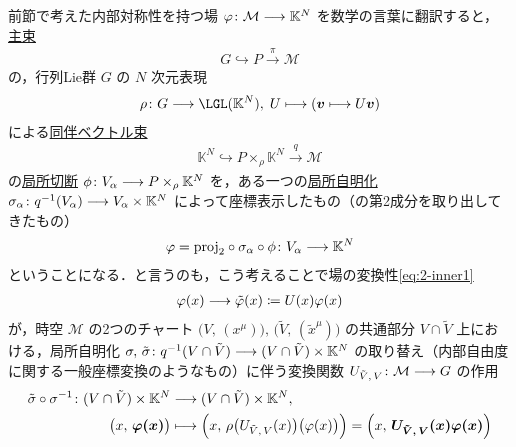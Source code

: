 \documentclass[geometry_main]{subfiles}
\begin{document}

    
前節で考えた内部対称性を持つ場 $\varphi \colon \mathcal{M} \longrightarrow \mathbb{K}^N$ を数学の言葉に翻訳すると，\hyperref[def.PFD]{主束}
\begin{align}
    G \hookrightarrow P \xrightarrow{\pi} \mathcal{M}
\end{align}
の，行列Lie群 $G$ の $N$ 次元表現
\begin{align}
    \rho \colon G \lto \LGL (\mathbb{K}^N),\; U \lmto (\bm{v} \lmto U\bm{v})
\end{align}
による\hyperref[def:associated-vect]{同伴ベクトル束}
\begin{align}
    \mathbb{K}^N \hookrightarrow P \times_\rho \mathbb{K}^N \xrightarrow{q} \mathcal{M}
\end{align}
の\hyperref[def.section]{局所切断} $\phi \colon V_\alpha \longrightarrow P \times_\rho \mathbb{K}^N$ を，ある一つの\hyperref[def.fiber-1]{局所自明化} $\sigma_\alpha \colon q^{-1}(V_\alpha) \longrightarrow V_\alpha \times \mathbb{K}^N$ によって座標表示したもの（の第2成分を取り出してきたもの）
\begin{align}
    \varphi = \mathrm{proj}_2 \circ \sigma_\alpha \circ \phi \colon V_\alpha \longrightarrow \mathbb{K}^N
\end{align}
ということになる．と言うのも，こう考えることで場の変換性\eqref{eq:2-inner1}
\begin{align}
    \varphi(x) \longrightarrow \tilde{\varphi}(x) \coloneqq U(x) \varphi (x)
\end{align}
が，時空 $\mathcal{M}$ の2つのチャート $\bigl(V,\, (x^\mu)\bigr),\, \bigl(\tilde{V},\, (\tilde{x}^\mu)\bigr)$ の共通部分 $V \cap \tilde{V}$ 上における，局所自明化 $\sigma,\, \tilde{\sigma} \colon q^{-1} (V \cap \tilde{V}) \longrightarrow (V \cap \tilde{V}) \times \mathbb{K}^N$ の取り替え（内部自由度に関する一般座標変換のようなもの）に伴う変換関数 $U_{\tilde{V},\, V} \colon \mathcal{M} \longrightarrow G$ の作用
\begin{align}
    \tilde{\sigma} \circ \sigma^{-1} \colon (V \cap \tilde{V}) \times \mathbb{K}^N &\longrightarrow (V \cap \tilde{V}) \times \mathbb{K}^N, \\
    \bigl(x,\, \bm{\varphi(x)}\bigr) &\longmapsto \Bigl(x,\, \rho\bigl(U_{\tilde{V},\, V}(x)\bigr)\bigl( \varphi(x) \bigr) \Bigr) = \Bigl( x,\, \bm{U_{\tilde{V},\, V} (x) \varphi(x)} \Bigr) \label{eq:field-locsym}
\end{align}
\end{document}

